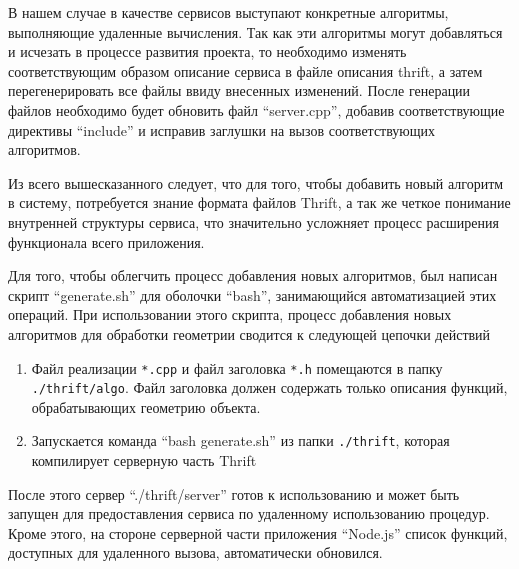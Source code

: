 \documentclass[12pt, a4paper]{article}
\begin{document}
В нашем случае в качестве сервисов выступают конкретные алгоритмы, выполняющие
удаленные вычисления. Так как эти алгоритмы могут добавляться и исчезать в
процессе развития проекта, то необходимо изменять соответствующим образом
описание сервиса в файле описания thrift, а затем перегенерировать все файлы
ввиду внесенных изменений. После генерации файлов необходимо будет обновить
файл ``server.cpp'', добавив соответствующие директивы ``include'' и исправив
заглушки на вызов соответствующих алгоритмов.

Из всего вышесказанного следует, что для того, чтобы добавить новый алгоритм в
систему, потребуется знание
формата файлов Thrift, а так же четкое понимание внутренней структуры сервиса,
что значительно усложняет процесс расширения функционала всего приложения.

Для того, чтобы облегчить процесс добавления новых алгоритмов, был написан
скрипт ``generate.sh'' для оболочки ``bash'', занимающийся автоматизацией этих
операций. При использовании этого скрипта, процесс добавления новых алгоритмов
для обработки геометрии сводится к следующей цепочки действий
\begin{enumerate}
    \item Файл реализации \texttt{*.cpp} и файл заголовка \texttt{*.h}
    помещаются в папку \texttt{./thrift/algo}. Файл заголовка должен содержать
    только описания функций, обрабатывающих геометрию объекта.
    \item Запускается команда ``bash generate.sh'' из папки \texttt{./thrift},
    которая компилирует серверную часть Thrift
\end{enumerate}

После этого сервер ``./thrift/server'' готов к использованию и может быть
запущен для предоставления сервиса по удаленному использованию процедур. Кроме
этого, на стороне серверной части приложения ``Node.js'' список функций,
доступных для удаленного вызова, автоматически обновился.
\end{document}
